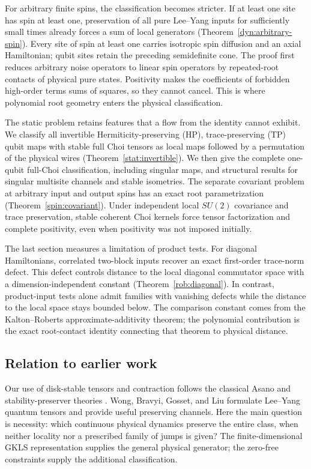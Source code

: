 \documentclass[reqno]{amsart}
\theoremstyle{definition}
\theoremstyle{remark}
\begin{document}
For arbitrary finite spins, the classification becomes stricter. If at
least one site has spin at least one, preservation of all pure Lee--Yang
inputs for sufficiently small times already forces a sum of local
generators (Theorem~\ref{dyn:arbitrary-spin}). Every site of spin at least
one carries isotropic spin diffusion and an axial Hamiltonian; qubit
sites retain the preceding semidefinite cone. The proof first reduces
arbitrary noise operators to linear spin operators by repeated-root
contacts of physical pure states. Positivity makes the coefficients of
forbidden high-order terms sums of squares, so they cannot cancel.
This is where polynomial root geometry enters the physical classification.

The static problem retains features that a flow from the identity cannot
exhibit. We classify all invertible Hermiticity-preserving (HP),
trace-preserving (TP) qubit maps with stable full
Choi tensors as local maps followed by a permutation of the physical
wires (Theorem~\ref{stat:invertible}). We then give the complete
one-qubit full-Choi classification, including singular maps, and structural results
for singular multisite channels and stable isometries. The separate
covariant problem at arbitrary input and output spins has an exact root
parametrization (Theorem~\ref{spin:covariant}). Under independent local
$SU(2)$ covariance and trace preservation, stable coherent Choi kernels
force tensor factorization and complete positivity, even when positivity
was not imposed initially.

The last section measures a limitation of product tests. For diagonal
Hamiltonians, correlated two-block inputs recover an exact first-order
trace-norm defect. This defect controls distance to the local diagonal
commutator space with a dimension-independent constant
(Theorem~\ref{rob:diagonal}). In contrast, product-input tests alone admit
families with vanishing defects while the distance to the local space stays
bounded below. The comparison constant comes from the Kalton--Roberts
approximate-additivity theorem; the polynomial contribution is the exact
root-contact identity connecting that theorem to physical distance.

\subsection*{Relation to earlier work}
Our use of disk-stable tensors and contraction follows the classical
Asano and stability-preserver theories
\cite{AsanoJapanese70,BB09,BB10II}. Wong, Bravyi, Gosset, and Liu
\cite{WBG26} formulate Lee--Yang quantum tensors and provide useful
preserving channels. Here the main question is necessity: which
continuous physical dynamics preserve the entire class, when neither
locality nor a prescribed family of jumps is given? The finite-dimensional
GKLS representation \cite{GKS76,Lindblad76} supplies the general
physical generator; the zero-free constraints supply the additional
classification.
\end{document}
